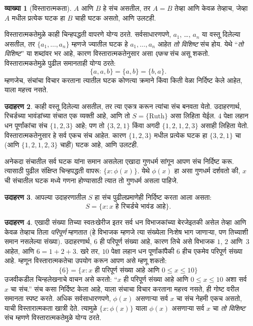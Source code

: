 \documentclass[11pt,a4paper,openany]{book}
\theoremstyle{definition}
\newtheorem{defn}{व्याख्या}[section]
\newtheorem{ex}[defn]{उदाहरण}
\newcommand{\Setabs}[2]{\{#1:#2\}}
\begin{document}
\begin{defn}[विस्तारात्मकता]
  $A$ आणि $B$ हे संच असतील, तर $A = B$ तेव्हा आणि केवळ तेव्हाच, जेव्हा
  $A$ मधील प्रत्येक घटक हा $B$ चाही घटक असतो, आणि उलटही.
\end{defn}

विस्तारात्मकतेमुळे काही चिन्हपद्धती वापरणे योग्य ठरते. सर्वसाधारणपणे,
$a_{1}$, \dots, $a_{n}$ या वस्तू दिलेल्या असतील, तर
$\{a_{1}, \dots, a_{n}\}$ म्हणजे ज्यातील घटक हे
$a_1, \ldots, a_n$ आहेत \emph{तो विशिष्ट} संच होय. येथे ``\emph{तो विशिष्ट}''
या शब्दांवर भर आहे, कारण विस्तारात्मकतेनुसार असा \emph{एकच} संच असू शकतो.
विस्तारात्मकतेमुळे पुढील समानताही योग्य ठरते:
  \[
    \{a, a, b\} = \{a, b\} = \{b,a\}.
  \]
म्हणजेच, संचांचा विचार करताना त्यातील घटक कोणत्या क्रमाने किंवा
किती वेळा निर्दिष्ट केले आहेत, याला महत्त्व नसते.


\begin{ex}
काही वस्तू दिलेल्या असतील, तर त्या एकत्र करून त्यांचा संच बनवता येतो.
उदाहरणार्थ, रिचर्डच्या भावंडांच्या संचात एक व्यक्ती आहे, आणि तो
$S=\{\textrm{Ruth}\}$ असा लिहिता येईल.
$4$ पेक्षा लहान धन पूर्णांकांचा संच $\{1, 2, 3\}$ आहे; पण तो
$\{3, 2, 1\}$ किंवा अगदी $\{1, 2, 1, 2, 3\}$ असाही लिहिता येतो.
विस्तारात्मकतेनुसार हे सर्व एकच संच आहेत. कारण $\{1, 2, 3\}$ मधील
प्रत्येक घटक हा $\{3, 2, 1\}$ चा (आणि $\{1,
2, 1, 2, 3\}$ चाही) घटक आहे, आणि उलटही.
\end{ex}


अनेकदा संचातील सर्व घटक यांना समान असलेला एखादा गुणधर्म सांगून आपण
संच निर्दिष्ट करू. त्यासाठी पुढील संक्षिप्त चिन्हपद्धती वापरू:
$\Setabs{x}{\phi(x)}$. येथे $\phi(x)$ हा असा गुणधर्म दर्शवतो की,
$x$ ची संचातील घटक मध्ये गणना होण्यासाठी त्यात तो गुणधर्म असला पाहिजे.


\begin{ex}
आपल्या उदाहरणातील $S$ हा संच पुढीलप्रमाणेही निर्दिष्ट करता आला असता:
\[
S = \Setabs{x}{x \text{ हे रिचर्डचे भावंड आहे}}.
\]
\end{ex}



\begin{ex}
एखादी संख्या तिच्या स्वतःखेरीज इतर सर्व धन विभाजकांच्या बेरजेइतकी असेल तेव्हा
आणि केवळ तेव्हाच तिला \emph{परिपूर्ण} म्हणतात (हे विभाजक म्हणजे त्या संख्येला
निःशेष भाग जाणाऱ्या, पण तिच्याशी समान नसलेल्या संख्या).
उदाहरणार्थ, $6$ ही परिपूर्ण संख्या आहे, कारण तिचे असे विभाजक
$1$, $2$ आणि~$3$ आहेत, आणि $6 = 1 + 2 + 3$.
खरे तर, $10$ पेक्षा लहान धन पूर्णांकांपैकी $6$ हीच एकमेव परिपूर्ण संख्या आहे.
म्हणून विस्तारात्मकतेचा उपयोग करून आपण असे म्हणू शकतो:
\[
	\{6\} = \Setabs{x}{x\text{ ही परिपूर्ण संख्या आहे आणि }0 \leq x \leq 10}
\]
उजवीकडील चिन्हलेखनाचे वाचन असे करतो: ``$x$ ही परिपूर्ण संख्या आहे आणि
$0 \leq x \leq 10$ अशा सर्व $x$ चा संच.'' संच कसा निर्दिष्ट केला आहे,
याला संचाचा विचार करताना महत्त्व नसते, ही गोष्ट वरील समानता स्पष्ट करते.
अधिक सर्वसाधारणपणे, $\phi(x)$ असणाऱ्या सर्व $x$ चा संच नेहमी एकच असतो,
याची विस्तारात्मकता खात्री देते.
त्यामुळे $\Setabs{x}{\phi(x)}$ याला $\phi(x)$ असणाऱ्या सर्व $x$ चा
\emph{तो विशिष्ट} संच म्हणणे विस्तारात्मकतेमुळे योग्य ठरते.
\end{ex}
\end{document}
